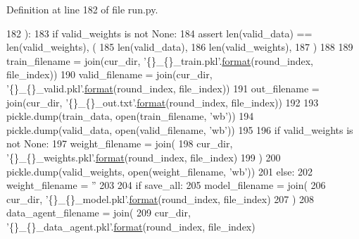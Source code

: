 Definition at line 182 of file run.\+py.


\begin{DoxyCode}
182 ):
183     \textcolor{keywordflow}{if} valid\_weights \textcolor{keywordflow}{is} \textcolor{keywordflow}{not} \textcolor{keywordtype}{None}:
184         \textcolor{keyword}{assert} len(valid\_data) == len(valid\_weights), (
185             len(valid\_data),
186             len(valid\_weights),
187         )
188 
189     train\_filename = join(cur\_dir, \textcolor{stringliteral}{'\{\}\_\{\}\_train.pkl'}.\hyperlink{namespaceparlai_1_1chat__service_1_1services_1_1messenger_1_1shared__utils_a32e2e2022b824fbaf80c747160b52a76}{format}(round\_index, file\_index))
190     valid\_filename = join(cur\_dir, \textcolor{stringliteral}{'\{\}\_\{\}\_valid.pkl'}.\hyperlink{namespaceparlai_1_1chat__service_1_1services_1_1messenger_1_1shared__utils_a32e2e2022b824fbaf80c747160b52a76}{format}(round\_index, file\_index))
191     out\_filename = join(cur\_dir, \textcolor{stringliteral}{'\{\}\_\{\}\_out.txt'}.\hyperlink{namespaceparlai_1_1chat__service_1_1services_1_1messenger_1_1shared__utils_a32e2e2022b824fbaf80c747160b52a76}{format}(round\_index, file\_index))
192 
193     pickle.dump(train\_data, open(train\_filename, \textcolor{stringliteral}{'wb'}))
194     pickle.dump(valid\_data, open(valid\_filename, \textcolor{stringliteral}{'wb'}))
195 
196     \textcolor{keywordflow}{if} valid\_weights \textcolor{keywordflow}{is} \textcolor{keywordflow}{not} \textcolor{keywordtype}{None}:
197         weight\_filename = join(
198             cur\_dir, \textcolor{stringliteral}{'\{\}\_\{\}\_weights.pkl'}.\hyperlink{namespaceparlai_1_1chat__service_1_1services_1_1messenger_1_1shared__utils_a32e2e2022b824fbaf80c747160b52a76}{format}(round\_index, file\_index)
199         )
200         pickle.dump(valid\_weights, open(weight\_filename, \textcolor{stringliteral}{'wb'}))
201     \textcolor{keywordflow}{else}:
202         weight\_filename = \textcolor{stringliteral}{''}
203 
204     \textcolor{keywordflow}{if} save\_all:
205         model\_filename = join(
206             cur\_dir, \textcolor{stringliteral}{'\{\}\_\{\}\_model.pkl'}.\hyperlink{namespaceparlai_1_1chat__service_1_1services_1_1messenger_1_1shared__utils_a32e2e2022b824fbaf80c747160b52a76}{format}(round\_index, file\_index)
207         )
208         data\_agent\_filename = join(
209             cur\_dir, \textcolor{stringliteral}{'\{\}\_\{\}\_data\_agent.pkl'}.\hyperlink{namespaceparlai_1_1chat__service_1_1services_1_1messenger_1_1shared__utils_a32e2e2022b824fbaf80c747160b52a76}{format}(round\_index, file\_index)

\end{DoxyCode}
